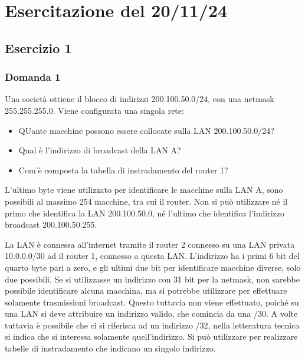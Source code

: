 \documentclass{article}
\numberwithin{equation}{subsection}
\begin{document}

\clearpage

\section{Esercitazione del 20/11/24}

\subsection*{Esercizio 1}
\subsubsection*{Domanda 1}

Una società ottiene il blocco di indirizzi 200.100.50.0/24, con una netmask 255.255.255.0. Viene configurata una singola rete:



\begin{itemize}
    \item QUante macchine possono essere collocate sulla LAN 200.100.50.0/24?
    \item Qual è l'indirizzo di broadcast della LAN A?
    \item Com'è composta la tabella di instradamento del router 1?
\end{itemize}

L'ultimo byte viene utilizzato per identificare le macchine sulla LAN A, sono possibili al massimo 254 macchine, tra cui il router. Non si può 
utilizzare né il primo che identifica la LAN 200.100.50.0, né l'ultimo che identifica l'indirizzo broadcast 200.100.50.255. 

La LAN è connessa all'internet tramite il router 2 connesso su una LAN privata 10.0.0.0/30 ad il router 1, connesso a questa LAN. 
L'indirizzo ha i primi 6 bit del quarto byte pari a zero, e gli ultimi due bit per identificare macchine diverse, solo due possibili. 
Se si utilizzasse un indirizzo con 31 bit per la netmask, non sarebbe possibile identificare alcuna macchina, ma si potrebbe utilizzare per 
effettuare solamente trasmissioni broadcast. Questo tuttavia non viene effettuato, poiché su una LAN si deve attribuire un indirizzo valido, 
che comincia da una /30. A volte tuttavia è possibile che ci si riferisca ad un indirizzo /32, nella letteratura tecnica si indica che si 
interessa solamente quell'indirizzo. Si può utilizzare per realizzare tabelle di instradamento che indicano un singolo indirizzo. 
\end{document}
